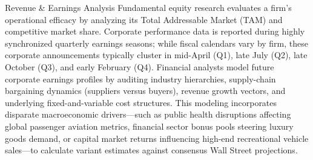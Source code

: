 \documentclass[10pt]{article}
\begin{document}
    \begin{core}{Revenue \& Earnings Analysis}
      Fundamental equity research evaluates a firm's operational efficacy by analyzing its Total Addressable Market (TAM) and competitive market share. Corporate performance data is reported during highly synchronized quarterly earnings seasons; while fiscal calendars vary by firm, these corporate announcements typically cluster in mid-April (Q1), late July (Q2), late October (Q3), and early February (Q4). Financial analysts model future corporate earnings profiles by auditing industry hierarchies, supply-chain bargaining dynamics (suppliers versus buyers), revenue growth vectors, and underlying fixed-and-variable cost structures. This modeling incorporates disparate macroeconomic drivers—such as public health disruptions affecting global passenger aviation metrics, financial sector bonus pools steering luxury goods demand, or capital market returns influencing high-end recreational vehicle sales—to calculate variant estimates against consensus Wall Street projections.
    \end{core}
\end{document}
